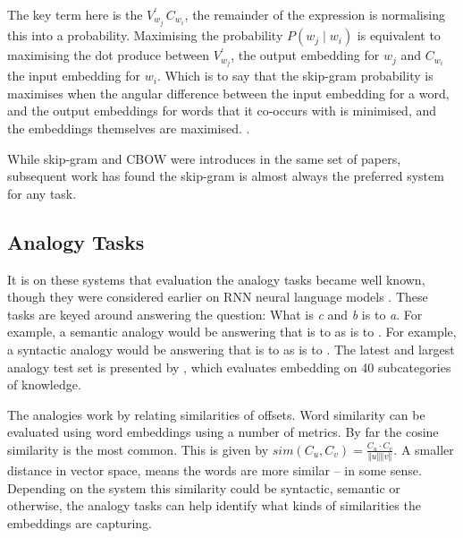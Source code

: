 \documentclass[parskip]{komatufte}
\begin{document}
The key term here is the $V_{w_j}^\prime\,C_{w_{i}}$,
the remainder of the expression is normalising this into a probability.
Maximising the probability $P(w_j \mid w_{i})$ is equivalent to maximising the dot produce between $V_{w_j}^\prime$, the output embedding for $w_j$ and  $C_{w_i}$ the input embedding for $w_i$.
Which is to say that the skip-gram probability is maximises when the angular difference between the input embedding for a word, and the output embeddings for words that it co-occurs with is minimised, and the embeddings themselves are maximised.
.


While skip-gram and CBOW were introduces in the same set of papers, subsequent work has found the skip-gram is almost always the preferred system for any task. 

\subsection{Analogy Tasks}

It is on these systems that evaluation the analogy tasks became well known, though they were considered earlier on RNN neural language models .
These tasks are keyed around answering the question: What is  \emph{c} and \emph{b} is to \emph{a}.
For example, a semantic analogy would be answering that  is to  as  is to .
For example, a syntactic analogy would be answering that  is to  as  is to .
The latest and largest analogy test set is presented by ,
which evaluates embedding on 40 subcategories of knowledge.

The analogies work by relating similarities of offsets.
Word similarity can be evaluated using word embeddings using a number of metrics.
By far the cosine similarity is the most common.
This is given by $sim(C_u, C_v)=\frac{C_{u}\cdot C_{v}}{\left\Vert u\right\Vert \left\Vert v\right\Vert }$.
A smaller distance in vector space, means the words are more similar -- in some sense.
Depending on the system this similarity could be syntactic, semantic or otherwise, the analogy tasks can help identify what kinds of similarities the embeddings are capturing.
\end{document}
